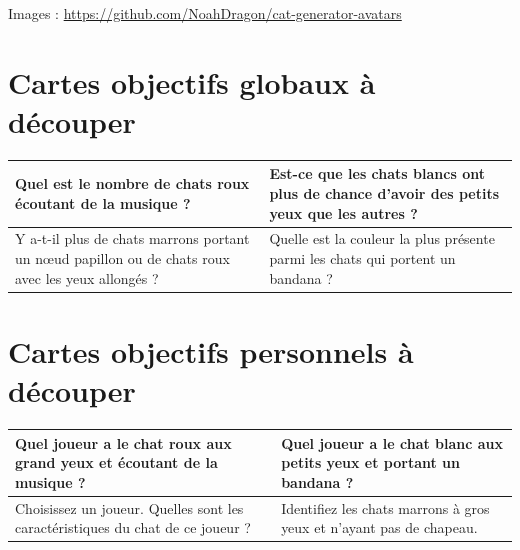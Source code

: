 \documentclass[a4paper, 12pt]{article}
\begin{document}
  Images : \url{https://github.com/NoahDragon/cat-generator-avatars}
  
\section*{Cartes objectifs globaux à découper}

\begin{center}

	\begin{tabular}{|>{\centering\arraybackslash}p{7cm}|>{\centering\arraybackslash}p{7cm}|}
	\hline \vspace{2mm}
	\Large{Quel est le nombre de chats roux écoutant de la musique ?} \vspace{2mm}& \vspace{2mm} \Large{Est-ce que les chats blancs ont plus de chance d'avoir des petits yeux que les autres ?} \vspace{2mm} \\
\hline \vspace{2mm}
	\Large{Y a-t-il plus de chats marrons portant un nœud papillon ou de chats roux avec les yeux allongés ?} \vspace{2mm}& \vspace{2mm} \Large{Quelle est la couleur la plus présente parmi les chats qui portent un bandana ?} \vspace{2mm} \\
	\hline
	\end{tabular}

\end{center}


\section*{Cartes objectifs personnels à découper}


\begin{center}

	\begin{tabular}{|>{\centering\arraybackslash}p{7cm}|>{\centering\arraybackslash}p{7cm}|}
	\hline \vspace{2mm}
	\Large{Quel joueur a le chat roux aux grand yeux et écoutant de la musique ?} \vspace{2mm}& \vspace{2mm} \Large{Quel joueur a le chat blanc aux petits yeux et portant un bandana ?} \vspace{2mm} \\
\hline \vspace{2mm}
	\Large{Choisissez un joueur. Quelles sont les caractéristiques du chat de ce joueur ?} \vspace{2mm}& \vspace{2mm} \Large{Identifiez les chats marrons à gros yeux et n'ayant pas de chapeau.} \vspace{2mm} \\
	\hline
	\end{tabular}

\end{center}
\end{document}
